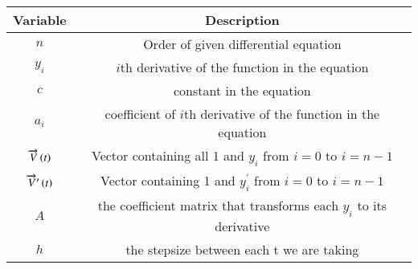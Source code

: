 \begin{tabular}[12pt]{ |c| c|}
    \hline
    \textbf{Variable} & \textbf{Description}\\ 
    \hline
    $n$ & Order of given differential equation\\
    \hline
    $y_i$ & $i$th derivative of the function in the equation\\
    \hline
    $c$ & constant in the equation\\
    \hline
    $a_i$&coefficient of $i$th derivative of the function in the equation\\
    \hline
    $\overrightarrow{V}\left(t\right)$& Vector containing all 1 and $y_i$ from $i=0$ to $i=n-1$\\
    \hline
    $\overrightarrow{V}^{\prime}\left(t\right)$ & Vector containing 1 and $y^{\prime}_i$ from $i=0$ to $i=n-1$\\
    \hline
    $A$& the coefficient matrix that transforms each $y_i$ to its derivative\\
    \hline
    $h$&the stepsize between each t we are taking\\
    \hline
    \end{tabular}
